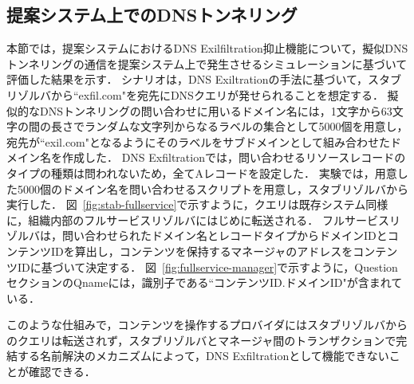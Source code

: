 \subsection{提案システム上でのDNSトンネリング}
\label{sec:eval-tunnel}
本節では，提案システムにおけるDNS Exilfiltration抑止機能について，擬似DNSトンネリングの通信を提案システム上で発生させるシミュレーションに基づいて評価した結果を示す．
シナリオは，DNS Exiltrationの手法に基づいて，スタブリゾルバから``exfil.com"を宛先にDNSクエリが発せられることを想定する．
擬似的なDNSトンネリングの問い合わせに用いるドメイン名には，1文字から63文字の間の長さでランダムな文字列からなるラベルの集合として5000個を用意し，宛先が``exil.com"となるようにそのラベルをサブドメインとして組み合わせたドメイン名を作成した．
DNS Exfiltrationでは，問い合わせるリソースレコードのタイプの種類は問われないため，全てAレコードを設定した．
実験では，用意した5000個のドメイン名を問い合わせるスクリプトを用意し，スタブリゾルバから実行した．
図~\ref{fig:stab-fullservice}で示すように，クエリは既存システム同様に，組織内部のフルサービスリゾルバにはじめに転送される．
フルサービスリゾルバは，問い合わせられたドメイン名とレコードタイプからドメインIDとコンテンツIDを算出し，コンテンツを保持するマネージャのアドレスをコンテンツIDに基づいて決定する．
図~\ref{fig:fullservice-manager}で示すように，QuestionセクションのQnameには，識別子である``コンテンツID.ドメインID"が含まれている．

このような仕組みで，コンテンツを操作するプロバイダにはスタブリゾルバからのクエリは転送されず，スタブリゾルバとマネージャ間のトランザクションで完結する名前解決のメカニズムによって，DNS Exfiltrationとして機能できないことが確認できる．


